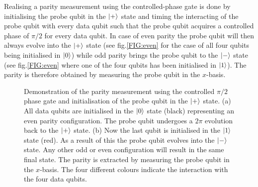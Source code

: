 Realising a parity measurement using the controlled-phase gate is done by initialising the probe qubit in the $\ket{+}$ state and timing the interacting of the probe qubit with every data qubit such that the probe qubit acquires a controlled phase of $\pi/2$ for every data qubit. In case of even parity the probe qubit will then always evolve into the $\ket{+}$ state (see fig.\@ \ref{FIG:even} for the case of all four qubits being initialised in $\ket{0}$) while odd parity brings the probe qubit to the $\ket{-}$ state (see fig.\@ \ref{FIG:even} where one of the four qubits has been initialised in $\ket{1}$). The parity is therefore obtained by measuring the probe qubit in the $x$-basis.    


\begin{figure}[H]
	\caption[oddeven]{Demonstration of the parity measurement using the controlled  $\pi/2$ phase gate and initialisation of the probe qubit in the $\ket{+}$ state. (a) All data qubits are initialised in the $\ket{0}$ state (black) representing an even parity configuration. The probe qubit undergoes a $2\pi$ evolution back to  the $\ket{+}$ state. (b) Now the last qubit is initialised in the $\ket{1}$ state (red). As a result of this the probe qubit evolves into the $\ket{-}$ state. Any other odd or even configuration will result in the same final state. The parity is extracted by measuring the probe qubit in the $x$-basis. The four different colours indicate the interaction with the four data qubits.}
	\label{FIG:evolution}
\end{figure}


